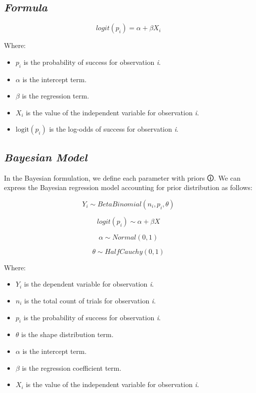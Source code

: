 \documentclass[
  letterpaper,
  DIV=11,
  numbers=noendperiod]{scrreprt}
\begin{document}
\subsection{\texorpdfstring{\emph{Formula}}{Formula}}\label{formula}

\[
logit(p_i) = \alpha + \beta X_i
\]

Where:

\begin{itemize}
\item
  \(p_i\) is the probability of success for observation \emph{i}.
\item
  \(\alpha\) is the intercept term.
\item
  \(\beta\) is the regression term.
\item
  \(X_i\) is the value of the independent variable for observation
  \emph{i}.
\item
  \(\text{logit}(p_i)\) is the log-odds of success for observation
  \emph{i}.
\end{itemize}

\subsection{\texorpdfstring{\emph{Bayesian
Model}}{Bayesian Model}}\label{bayesian-model}

In the Bayesian formulation, we define each parameter with
\label{prior}{{priors 🛈}}. We can express the Bayesian
regression model accounting for prior distribution as follows:

\[
Y_i \sim BetaBinomial(n_i, p_i, \theta)
\]

\[
logit(p_i) \sim \alpha + \beta X
\]

\[
\alpha \sim Normal(0,1)
\]

\[
\theta \sim HalfCauchy(0,1)
\]

Where:

\begin{itemize}
\item
  \(Y_i\) is the dependent variable for observation \emph{i}.
\item
  \(n_i\) is the total count of trials for observation \emph{i}.
\item
  \(p_i\) is the probability of success for observation \emph{i}.
\item
  \(\theta\) is the shape distribution term.
\item
  \(\alpha\) is the intercept term.
\item
  \(\beta\) is the regression coefficient term.
\item
  \(X_i\) is the value of the independent variable for observation
  \emph{i}.
\end{itemize}
\end{document}
